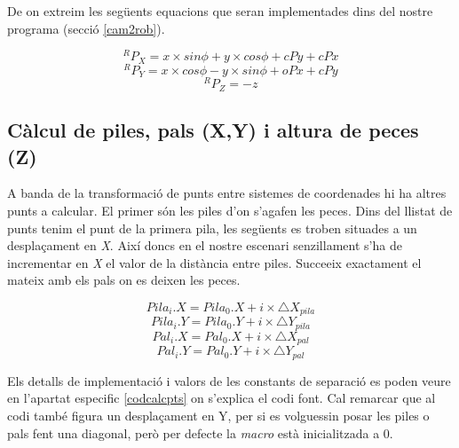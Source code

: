 De on extreim les següents equacions que seran implementades dins del
nostre programa (secció \ref{cam2rob}).

$$^RP_X = x\times sin \phi + y \times cos \phi + cPy + cPx$$
$$^RP_Y = x\times cos \phi - y \times sin \phi + oPx + cPy$$
$$^RP_Z = -z$$

\subsection{Càlcul de piles, pals (X,Y) i altura de peces (Z)} \label{calcpts}
A banda de la transformació de punts entre sistemes de coordenades hi ha altres
punts a calcular.
El primer són les piles d'on s'agafen les peces. Dins del llistat de punts
tenim el punt de la primera pila, les següents es troben situades a un
desplaçament en \emph{X}. Així doncs en el nostre escenari senzillament s'ha de
incrementar en \emph{X} el valor de la distància entre piles. Succeeix exactament
el mateix amb els pals on es deixen les peces.


$$ Pila_{i}.X = Pila_{0}.X + i \times  \bigtriangleup X_{pila} $$
$$ Pila_{i}.Y = Pila_{0}.Y + i \times \bigtriangleup Y_{pila} $$
$$ Pal_{i}.X = Pal_{0}.X + i \times \bigtriangleup X_{pal} $$
$$ Pal_{i}.Y = Pal_{0}.Y + i \times \bigtriangleup Y_{pal} $$

Els detalls de implementació i valors de les constants de separació es poden
veure en l'apartat especific \ref{codcalcpts} on s'explica el codi font. Cal
remarcar que al codi també figura un desplaçament en Y, per si es volguessin
posar les piles o pals fent una diagonal, però per defecte la \emph{macro}
està inicialitzada a 0.




